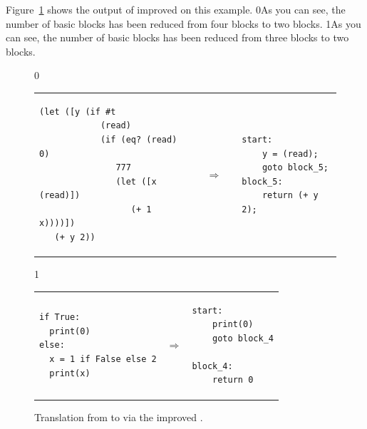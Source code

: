 \documentclass[7x10]{TimesAPriori_MIT}%
\def\racketEd{0}
\def\pythonEd{1}
\providecommand{\BookEdition}{1}
\let\edition\BookEdition
\newcommand{\racket}[1]{{\if\edition\racketEd{#1}\fi}}
\newcommand{\pythonColor}[0]{}
\newcommand{\python}[1]{{\if\edition\pythonEd\pythonColor #1\fi}}
\numberwithin{theorem}{chapter}
\numberwithin{definition}{chapter}
\numberwithin{equation}{chapter}
\begin{document}
Figure~\ref{fig:explicate-control-challenge} shows the output of
improved  on this example.
\racket{As you can see, the number of basic blocks has been reduced
  from four blocks to two blocks.}%
\python{As you can see, the number of basic blocks has been reduced
  from three blocks to two blocks.}

\begin{figure}[tbp]
  \begin{tcolorbox}[colback=white]
    {\if\edition\racketEd        
\begin{tabular}{lll}
\begin{minipage}{0.45\textwidth}
\begin{lstlisting}
(let ([y (if #t
            (read)
            (if (eq? (read) 0)
               777
               (let ([x (read)])
                  (+ 1 x))))])
   (+ y 2))
\end{lstlisting}
\end{minipage}
&
$\quad\Rightarrow\quad$
&
\begin{minipage}{0.4\textwidth}
\begin{lstlisting}
start:
    y = (read);
    goto block_5;
block_5:
    return (+ y 2);
\end{lstlisting}
\end{minipage}
\end{tabular} 
\fi}
{\if\edition\pythonEd\pythonColor
\begin{tabular}{lll}
\begin{minipage}{0.4\textwidth}
\begin{lstlisting}
if True:
  print(0)
else:
  x = 1 if False else 2
  print(x)
\end{lstlisting}
\end{minipage}
&
$\Rightarrow$
&
\begin{minipage}{0.55\textwidth}
\begin{lstlisting}
start:
    print(0)
    goto block_4
    
block_4:
    return 0
\end{lstlisting}
\end{minipage}
\end{tabular} 
\fi}
  \end{tcolorbox}

  \caption{Translation from \LangIf{} to \LangCIf{}
  via the improved .}
\label{fig:explicate-control-challenge}
\end{figure}
\end{document}
